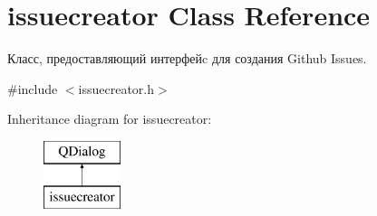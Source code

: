 \hypertarget{classissuecreator}{}\section{issuecreator Class Reference}
\label{classissuecreator}


Класс, предоставляющий интерфейc для создания Github Issues.  




{\ttfamily \#include $<$issuecreator.\+h$>$}

Inheritance diagram for issuecreator\+:\begin{figure}[H]
\begin{center}
\leavevmode
\includegraphics[height=2.000000cm]{classissuecreator}
\end{center}
\end{figure}
